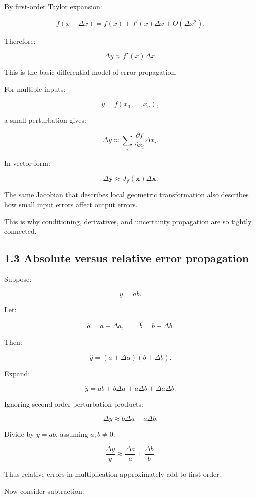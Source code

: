 By first-order Taylor expansion:

\[ f(x+\Delta x) = f(x)+f'(x)\Delta x+ O(\Delta x^2). \]

Therefore:

\[ \boxed{ \Delta y\approx f'(x)\Delta x }. \]

This is the basic differential model of error propagation.

For multiple inputs:

\[ y=f(x_1,\ldots,x_n), \]

a small perturbation gives:

\[ \boxed{ \Delta y\approx \sum_i \frac{\partial f}{\partial x_i} \Delta x_i }. \]

In vector form:

\[ \boxed{ \Delta\mathbf y\approx J_f(\mathbf x)\Delta\mathbf x }. \]

The same Jacobian that describes local geometric transformation also describes how small input errors affect output errors.

This is why conditioning, derivatives, and uncertainty propagation are so tightly connected.

\subsection{1.3 Absolute versus relative error propagation}\label{02-foundations-ii-ch028-absolute-versus-relative-error-propagation}

Suppose:

\[ y=ab. \]

Let:

\[ \hat a=a+\Delta a,\qquad \hat b=b+\Delta b. \]

Then:

\[ \hat y=(a+\Delta a)(b+\Delta b). \]

Expand:

\[ \hat y = ab+b\Delta a+a\Delta b+\Delta a\Delta b. \]

Ignoring second-order perturbation products:

\[ \Delta y\approx b\Delta a+a\Delta b. \]

Divide by \(y=ab\), assuming \(a,b\ne0\):

\[ \boxed{ \frac{\Delta y}{y} \approx \frac{\Delta a}{a}+ \frac{\Delta b}{b} }. \]

Thus relative errors in multiplication approximately add to first order.

Now consider subtraction:

